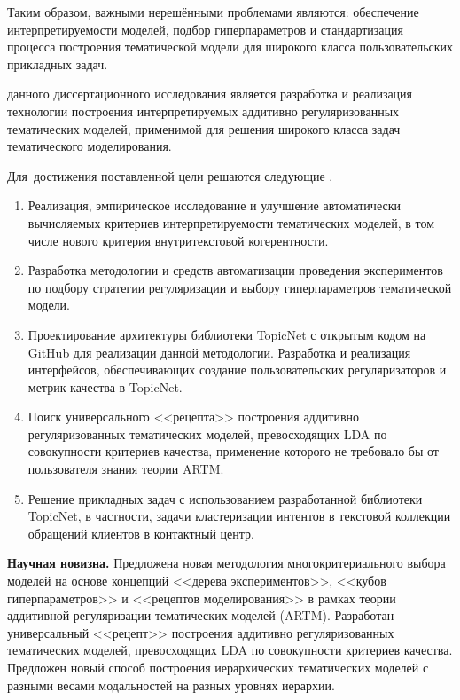 Таким образом, важными нерешёнными проблемами являются: обеспечение  интерпретируемости моделей, подбор гиперпараметров и стандартизация процесса построения тематической модели для широкого класса пользовательских прикладных задач.

{\aim} данного диссертационного исследования является разработка и реализация технологии построения интерпретируемых аддитивно регуляризованных тематических моделей, применимой для решения широкого класса задач тематического моделирования. 

Для~достижения поставленной цели решаются следующие {\tasks}.
\begin{enumerate}[beginpenalty=10000] %
  \item Реализация, эмпирическое исследование и улучшение автоматически вычисляемых критериев интерпретируемости тематических моделей, в том числе нового критерия внутритекстовой когерентности.
  \item Разработка методологии и средств автоматизации проведения экспериментов по подбору стратегии регуляризации и выбору гиперпараметров тематической модели.
  \item Проектирование архитектуры библиотеки TopicNet с открытым кодом на GitHub для реализации данной методологии. Разработка и реализация интерфейсов, обеспечивающих создание пользовательских регуляризаторов и метрик качества в TopicNet.
  \item Поиск универсального <<рецепта>> построения аддитивно регуляризованных тематических моделей, превосходящих LDA по совокупности критериев качества, применение которого не требовало бы от пользователя знания теории ARTM.
  \item Решение прикладных задач с использованием разработанной библиотеки TopicNet, в частности, задачи кластеризации интентов в текстовой коллекции обращений клиентов в контактный центр.
\end{enumerate}

\textbf{Научная новизна.} 
Предложена новая методология многокритериального выбора моделей на основе концепций <<дерева экспериментов>>, <<кубов гиперпараметров>> и <<рецептов моделирования>> в рамках теории аддитивной регуляризации тематических моделей (ARTM).
Разработан универсальный <<рецепт>> построения аддитивно регуляризованных тематических моделей, превосходящих LDA по совокупности критериев качества.
Предложен новый способ построения иерархических тематических моделей с разными весами модальностей на разных уровнях иерархии. 

